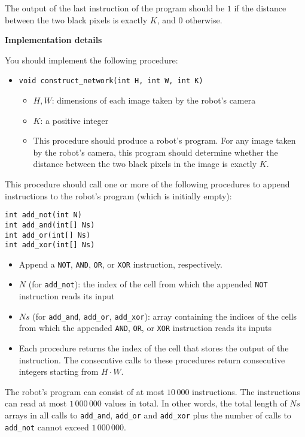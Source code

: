 The output of the last instruction of the program should be $1$ if the distance between the two black pixels is exactly $K$, and $0$ otherwise.

\textbf{Implementation details}

You should implement the following procedure:

\begin{itemize}
\item \texttt{void construct\_network(int H, int W, int K)}
\begin{itemize}
\item $H, W$: dimensions of each image taken by the robot's camera
\item $K$: a positive integer
\item This procedure should produce a robot's program. For any image taken by the robot's camera, this program should determine whether the distance between the two black pixels in the image is exactly $K$.
\end{itemize}
\end{itemize}

This procedure should call one or more of the following procedures to append instructions to the robot's program (which is initially empty):

\begin{verbatim}
int add_not(int N)
int add_and(int[] Ns)
int add_or(int[] Ns)
int add_xor(int[] Ns)
\end{verbatim}

\begin{itemize}
\item Append a \texttt{NOT}, \texttt{AND}, \texttt{OR}, or \texttt{XOR} instruction, respectively.
\item $N$ (for \texttt{add\_not}): the index of the cell from which the appended \texttt{NOT} instruction reads its input
\item $Ns$ (for \texttt{add\_and}, \texttt{add\_or}, \texttt{add\_xor}): array containing the indices of the cells from which the appended \texttt{AND}, \texttt{OR}, or \texttt{XOR} instruction reads its inputs
\item Each procedure returns the index of the cell that stores the output of the instruction. The consecutive calls to these procedures return consecutive integers starting from $H \cdot W$.
\end{itemize}

The robot's program can consist of at most $10\,000$ instructions. The instructions can read at most $1\,000\,000$ values in total. In other words, the total length of $Ns$ arrays in all calls to \texttt{add\_and}, \texttt{add\_or} and \texttt{add\_xor} plus the number of calls to \texttt{add\_not} cannot exceed $1\,000\,000$.

